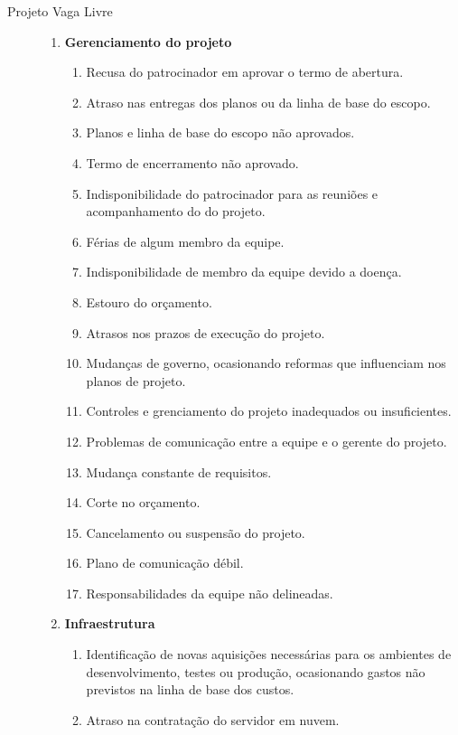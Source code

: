 \begin{description}
	\item[Projeto Vaga Livre] \hfill
	\begin{enumerate}[label=\arabic*.]
		\item \textbf{Gerenciamento do projeto}
		      \begin{enumerate}[label*=\arabic*.]
			      \item Recusa do patrocinador em aprovar o termo de abertura.
			      \item Atraso nas entregas dos planos ou da linha de base do escopo.
			      \item Planos e linha de base do escopo não aprovados.
			      \item Termo de encerramento não aprovado.
			      \item Indisponibilidade do patrocinador para as reuniões e acompanhamento do  do projeto.
			      \item Férias de algum membro da equipe.
			      \item Indisponibilidade de membro da equipe devido a doença.
			      \item Estouro do orçamento.
			      \item Atrasos nos prazos de execução do projeto.
			      \item Mudanças de governo, ocasionando reformas que influenciam nos planos de projeto.
			      \item Controles e grenciamento do projeto inadequados ou insuficientes.
			      \item Problemas de comunicação entre a equipe e o gerente do projeto.
			      \item Mudança constante de requisitos.
			      \item Corte no orçamento.
			      \item Cancelamento ou suspensão do projeto.
			      \item Plano de comunicação débil.
			      \item Responsabilidades da equipe não delineadas.
		      \end{enumerate}
		\item \textbf{Infraestrutura}
		      \begin{enumerate}[label*=\arabic*.]
			      \item Identificação de novas aquisições necessárias para os ambientes de desenvolvimento, testes ou produção, ocasionando gastos não previstos na linha de base dos custos.
			      \item Atraso na contratação do servidor em nuvem.

\end{enumerate}
\end{enumerate}
\end{description}
